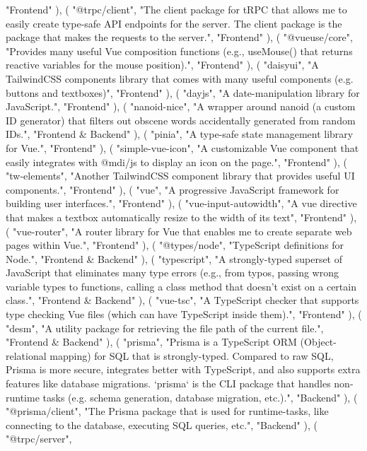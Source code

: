 \documentclass[12pt]{report}
\begin{document}
\begin{pycode}
		"Frontend"
	),
	(
		"@trpc/client",
		"The client package for tRPC that allows me to easily create type-safe API endpoints for the server. The client package is the package that makes the requests to the server.",
		"Frontend"
	),
	(
		"@vueuse/core",
		"Provides many useful Vue composition functions (e.g., useMouse() that returns reactive variables for the mouse position).",
		"Frontend"
	),
	(
		"daisyui",
		"A TailwindCSS components library that comes with many useful components (e.g. buttons and textboxes)",
		"Frontend"
	),
	(
		"dayjs",
		"A date-manipulation library for JavaScript.",
		"Frontend"
	),
	(
		"nanoid-nice",
		"A wrapper around nanoid (a custom ID generator) that filters out obscene words accidentally generated from random IDs.",
		"Frontend & Backend"
	),
	(
		"pinia",
		"A type-safe state management library for Vue.",
		"Frontend"
	),
	(
		"simple-vue-icon",
		"A customizable Vue component that easily integrates with @mdi/js to display an icon on the page.",
		"Frontend"
	),
	(
		"tw-elements",
		"Another TailwindCSS component library that provides useful UI components.",
		"Frontend"
	),
	(
		"vue",
		"A progressive JavaScript framework for building user interfaces.",
		"Frontend"
	),
	(
		"vue-input-autowidth",
		"A vue directive that makes a textbox automatically resize to the width of its text",
		"Frontend"
	),
	(
		"vue-router",
		"A router library for Vue that enables me to create separate web pages within Vue.",
		"Frontend"
	),
	(
		"@types/node",
		"TypeScript definitions for Node.",
		"Frontend & Backend"
	),
	(
		"typescript",
		"A strongly-typed superset of JavaScript that eliminates many type errors (e.g., from typos, passing wrong variable types to functions, calling a class method that doesn't exist on a certain class.",
		"Frontend & Backend"
	),
	(
		"vue-tsc",
		"A TypeScript checker that supports type checking Vue files (which can have TypeScript inside them).",
		"Frontend"
	),
	(
		"desm",
		"A utility package for retrieving the file path of the current file.",
		"Frontend & Backend"
	),
	(
		"prisma",
		"Prisma is a TypeScript ORM (Object-relational mapping) for SQL that is strongly-typed. Compared to raw SQL, Prisma is more secure, integrates better with TypeScript, and also supports extra features like database migrations. `prisma` is the CLI package that handles non-runtime tasks (e.g. schema generation, database migration, etc.).",
		"Backend"
	),
	(
		"@prisma/client",
		"The Prisma package that is used for runtime-tasks, like connecting to the database, executing SQL queries, etc.",
		"Backend"
	),
	(
		"@trpc/server",

\end{pycode}
\end{document}
